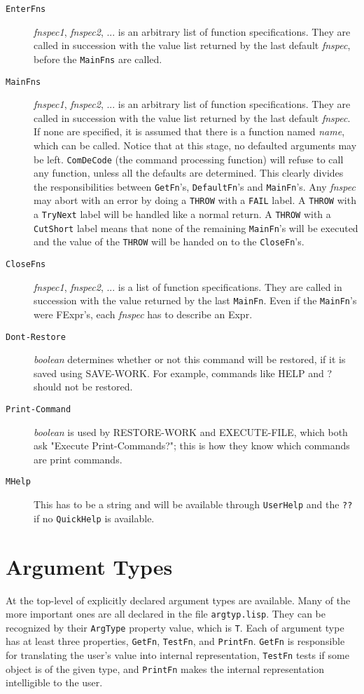 \begin{description}
\item [{\tt EnterFns}] {\it fnspec1}, {\it fnspec2}, ... is an arbitrary list of function
specifications.  They are called in succession with the value list
returned by the last default {\it fnspec}, before the {\tt MainFns} are called.

\item [{\tt MainFns}] {\it fnspec1}, {\it fnspec2}, ... is an arbitrary list of function
specifications.  They are called in succession with the value list
returned by the last default {\it fnspec}.  If none are specified, it is assumed
that there is a function named {\it name}, which can be called.
Notice that at this stage, no defaulted arguments may be left.
{\tt ComDeCode} (the command processing function) will refuse to call
any function, unless all the defaults are determined.  This clearly
divides the responsibilities between {\tt GetFn}'s, {\tt DefaultFn}'s and
{\tt MainFn}'s. Any {\it fnspec} may abort with an error by doing a
{\tt THROW} with a {\tt FAIL} label.  A {\tt THROW} with a {\tt TryNext} label
will be handled like a normal return.  A {\tt THROW} with a {\tt CutShort} label
means that none of the remaining {\tt MainFn}'s will be executed and the 
value of the {\tt THROW} will be handed on to the {\tt CloseFn}'s.

\item [{\tt CloseFns}] {\it fnspec1}, {\it fnspec2}, ... is a list of function
specifications.  They are called in succession with the value returned
by the last {\tt MainFn}.  Even if the {\tt MainFn}'s were FExpr's, each
{\it fnspec} has to describe an Expr.

\item [{\tt Dont-Restore}] {\it boolean} determines whether or not this command will be
restored, if it is saved using SAVE-WORK. For example, commands like HELP and ? should not
be restored.

\item [{\tt Print-Command}] {\it boolean} is used by RESTORE-WORK and EXECUTE-FILE, which 
both ask "Execute Print-Commands?"; this is how they know which commands are print 
commands.

\item [{\tt MHelp}] This has to be a string and will be available through
{\tt UserHelp} and the {\tt ??} if no {\tt QuickHelp} is available.

\end{description}

\section{Argument Types}
At the top-level of \TPS
explicitly declared argument types are available.  Many of the more important ones are
all declared in the file {\tt argtyp.lisp}.  They can be recognized by their
{\tt ArgType} property value, which is {\tt T}.  Each of argument type
has at least three properties, {\tt GetFn}, {\tt TestFn}, and {\tt PrintFn}.
{\tt GetFn} is responsible for translating the user's value
into internal representation, {\tt TestFn} tests if some object is of the given
type, and {\tt PrintFn} makes the internal
representation intelligible to the user.  

